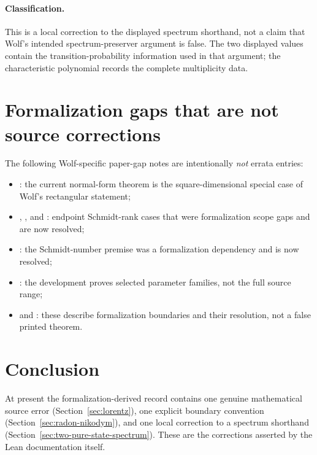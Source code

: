 \documentclass{article}
\begin{document}
\paragraph{Classification.}
This is a local correction to the displayed spectrum shorthand, not a claim
that Wolf's intended spectrum-preserver argument is false. The two displayed
values contain the transition-probability information used in that argument;
the characteristic polynomial records the complete multiplicity data.

\section{Formalization gaps that are not source corrections}

The following Wolf-specific paper-gap notes are intentionally \emph{not}
errata entries:
\begin{itemize}
  \item {}: the current normal-form theorem is
    the square-dimensional special case of Wolf's rectangular statement;
  \item {},
    , and
    : endpoint Schmidt-rank cases that
    were formalization scope gaps and are now resolved;
  \item {}: the
    Schmidt-number premise was a formalization dependency and is now resolved;
  \item {}: the development
    proves selected parameter families, not the full source range;
  \item {} and
    : these describe
    formalization boundaries and their resolution, not a false printed theorem.
\end{itemize}

\section{Conclusion}

At present the formalization-derived record contains one genuine mathematical
source error (Section~\ref{sec:lorentz}), one explicit boundary convention
(Section~\ref{sec:radon-nikodym}), and one local correction to a spectrum
shorthand (Section~\ref{sec:two-pure-state-spectrum}). These are the corrections
asserted by the Lean documentation itself.
\end{document}
